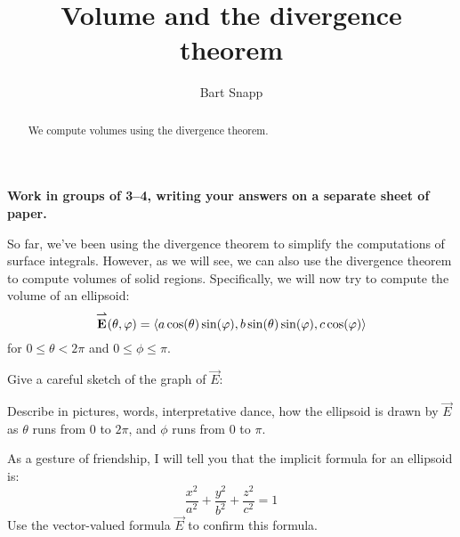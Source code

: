 \documentclass[nooutcomes,noauthor]{ximera}
\author{Bart Snapp}
\title[Collaborate:]{Volume and the divergence theorem}
\begin{document}
\begin{abstract}
  We compute volumes using the divergence theorem.
\end{abstract}
\maketitle

\textbf{Work in groups of 3--4, writing your answers on a separate
  sheet of paper.}


So far, we've been using the divergence theorem to simplify the
computations of surface integrals. However, as we will see, we can
also use the divergence theorem to compute volumes of solid
regions. Specifically, we will now try to compute the volume of an
ellipsoid:
\[
{\overset{\boldsymbol{\rightharpoonup}}{\mathbf{E}}}(\theta,\varphi) = \left\langle a \cos(\theta)\sin(\varphi), b \sin(\theta)\sin(\varphi),c \cos(\varphi)\right\rangle
\]
for $0\le \theta< 2\pi$ and $0\le \phi\le \pi$.

\begin{problem}
  Give a careful sketch of the graph of $\vec{E}$:
  \begin{image}
  \end{image}
\end{problem}

\begin{problem}
  Describe in pictures, words, interpretative dance, how the ellipsoid
  is drawn by $\vec{E}$ as $\theta$ runs from $0$ to $2\pi$, and
  $\phi$ runs from $0$ to $\pi$.
\end{problem}


\begin{problem}
  As a gesture of friendship, I will tell you that the implicit
  formula for an ellipsoid is:
  \[
  \frac{x^2}{a^2} + \frac{y^2}{b^2} + \frac{z^2}{c^2} =1
  \]
  Use the vector-valued formula $\vec{E}$ to confirm this formula.
\end{problem}
\end{document}
